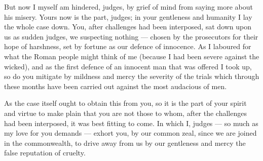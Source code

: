  But now I myself am hindered, judges, by grief of mind from saying more about his misery. Yours now is the part, judges; in your gentleness and humanity I lay the whole case down. You, after challenges had been interposed, sat down upon us as sudden judges, we suspecting nothing --- chosen by the prosecutors for their hope of harshness, set by fortune as our defence of innocence. As I laboured for what the Roman people might think of me (because I had been severe against the wicked), and as the first defence of an innocent man that was offered I took up, so do you mitigate by mildness and mercy the severity of the trials which through these months have been carried out against the most audacious of men.

 As the case itself ought to obtain this from you, so it is the part of your spirit and virtue to make plain that you are not those to whom, after the challenges had been interposed, it was best fitting to come. In which I, judges --- so much as my love for you demands --- exhort you, by our common zeal, since we are joined in the commonwealth, to drive away from us by our gentleness and mercy the false reputation of cruelty.











